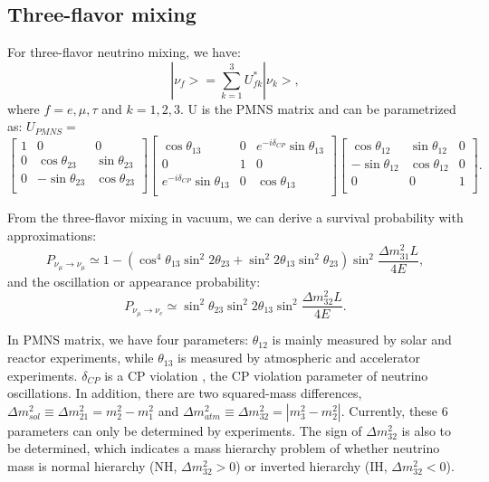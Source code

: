\documentclass[preprint,12pt]{elsarticle}
\numberwithin{equation}{section}
\begin{document}
\subsection{Three-flavor mixing}
For three-flavor neutrino mixing, we have:
\begin{equation}\label{eq:mixingmatrix}
|\nu_f> = \sum_{k=1}^3U^*_{fk}|\nu_k>, 
\end{equation}
where $f=e,\mu,\tau$ and $k=1,2,3$. U is the PMNS matrix and can be parametrized as: 
$U_{PMNS} = $
\begin{equation}
\begin{bmatrix}
1 &0 &0\\
0 &\cos\theta_{23} &\sin\theta_{23}\\
0 &-\sin\theta_{23} &\cos\theta_{23}\\ 
\end{bmatrix}
\begin{bmatrix}
\cos\theta_{13} &0 &e^{-i\delta_{CP}}\sin\theta_{13}\\
0 &1 &0\\
e^{-i\delta_{CP}}\sin\theta_{13} &0 &\cos\theta_{13}\\ 
\end{bmatrix}
\begin{bmatrix}
\cos\theta_{12} &\sin\theta_{12} &0\\
-\sin\theta_{12} &\cos\theta_{12} &0\\
0 &0 &1\\ 
\end{bmatrix}.
\end{equation}

From the three-flavor mixing in vacuum, we can derive a survival probability with approximations:
\begin{equation}\label{eq:disappear}
P_{\nu_\mu\to\nu_\mu}\simeq 1-(\cos^4\theta_{13}\sin^2 2\theta_{23}+\sin^2 2\theta_{13}\sin^2\theta_{23})\sin^2\frac{\Delta m^2_{31}L}{4E},
\end{equation}
and the oscillation or appearance probability\cite{nakaya}:
\begin{equation}\label{eq:appear}
P_{\nu_\mu\to\nu_e}\simeq \sin^2 \theta_{23}\sin^2 2\theta_{13}\sin^2 \frac{\Delta m^2_{32}L}{4E}.
\end{equation}

In PMNS matrix, we have four parameters: $\theta_{12}$ is mainly measured by solar and reactor experiments, while $\theta_{13}$ is measured by atmospheric and accelerator experiments. $\delta_{CP}$ is a CP violation , the CP violation parameter of neutrino oscillations. In addition, there are two squared-mass differences, $\Delta m^2_{sol}\equiv\Delta m^2_{21}=m_2^2-m_1^2$ and $\Delta m^2_{atm}\equiv\Delta m^2_{32}=|m_3^2-m_2^2|$. Currently, these 6 parameters can only be determined by experiments. The sign of $\Delta m^2_{32}$ is also to be determined, which indicates a mass hierarchy problem of whether neutrino mass is normal hierarchy (NH, $\Delta m^2_{32}>0$) or inverted hierarchy (IH, $\Delta m^2_{32}<0$).
\end{document}
